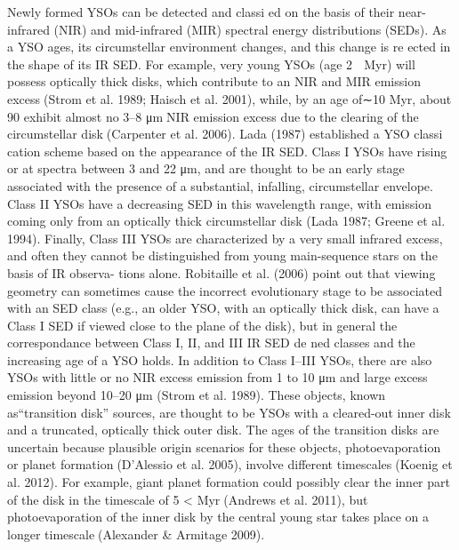 \documentclass[../Main.tex]{subfiles}
\begin{document}
{Newly formed YSOs can be detected and classi ed on the
basis of their near-infrared (NIR) and mid-infrared (MIR)
spectral energy distributions (SEDs). As a YSO ages, its
circumstellar environment changes, and this change is re ected
in the shape of its IR SED. For example, very young YSOs (age
2  Myr) will possess optically thick disks, which contribute to
an NIR and MIR emission excess(Strom et al. 1989; Haisch
et al. 2001), while, by an age of∼10 Myr, about 90%
exhibit almost no 3–8 μmNIR emission excess due to the
clearing of the circumstellar disk(Carpenter et al. 2006).
Lada (1987) established a YSO classi cation scheme based
on the appearance of the IR SED. Class I YSOs have rising or
at spectra between 3 and 22 μm, and are thought to be an early
stage associated with the presence of a substantial, infalling,
circumstellar envelope. Class II YSOs have a decreasing SED
in this wavelength range, with emission coming only from an
optically thick circumstellar disk (Lada 1987; Greene et al.
1994). Finally, Class III YSOs are characterized by a very
small infrared excess, and often they cannot be distinguished
from young main-sequence stars on the basis of IR observa-
tions alone. Robitaille et al. (2006) point out that viewing
geometry can sometimes cause the incorrect evolutionary stage
to be associated with an SED class (e.g., an older YSO, with an
optically thick disk, can have a Class I SED if viewed close to
the plane of the disk), but in general the correspondance
between Class I, II, and III IR SED de ned classes and the
increasing age of a YSO holds.
In addition to Class I–III YSOs, there are also YSOs with little
or no NIR excess emission from 1 to 10 μm and large excess
emission beyond 10–20 μm (Strom et al. 1989). These objects,
known as“transition disk” sources, are thought to be YSOs with
a cleared-out inner disk and a truncated, optically thick outer
disk. The ages of the transition disks are uncertain because
plausible origin scenarios for these objects, photoevaporation or
planet formation(D’Alessio et al. 2005), involve different
timescales(Koenig et al. 2012). For example, giant planet
formation could possibly clear the inner part of the disk in the timescale of 5
< Myr(Andrews et al. 2011), but photoevaporation
of the inner disk by the central young star takes place on a longer
timescale(Alexander & Armitage 2009).

}
\end{document}
